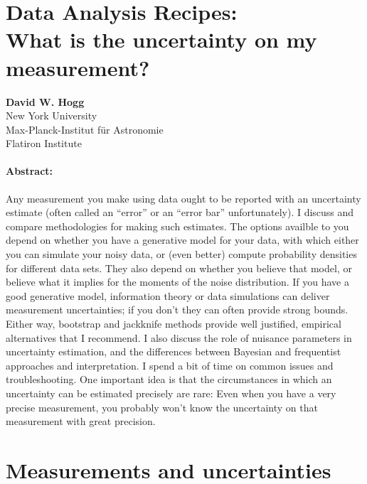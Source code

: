 \documentclass[12pt, letterpaper]{article}
\begin{document}
\sloppy\sloppypar\raggedbottom\frenchspacing

\section*{Data Analysis Recipes:\\
  What is the uncertainty on my measurement?}

\textbf{David W. Hogg} \\
{\footnotesize New York University} \\
{\footnotesize Max-Planck-Institut f\"ur Astronomie} \\
{\footnotesize Flatiron Institute}

\paragraph{Abstract:}
Any measurement you make using data ought to be reported with an uncertainty
estimate (often called an ``error'' or an ``error bar'' unfortunately).
I discuss and compare methodologies for making such estimates.
The options availble to you depend on whether you have a generative model for your
data, with which either you can simulate your noisy data, or (even better)
compute probability densities for different data sets.
They also depend on whether you believe that model,
or believe what it implies for the moments of the noise distribution.
If you have a good generative model, information theory or data simulations can deliver
measurement uncertainties; if you don't they can often provide strong bounds.
Either way, bootstrap and jackknife methods provide well justified, empirical
alternatives that I recommend.
I also discuss the role of nuisance parameters in uncertainty estimation, and
the differences between Bayesian and frequentist approaches and interpretation.
I spend a bit of time on common issues and troubleshooting.
One important idea is that the circumstances in which an uncertainty can be estimated
precisely are rare: Even when you have a very precise measurement, you probably won't
know the uncertainty on that measurement with great precision.

\section{Measurements and uncertainties}
\end{document}

